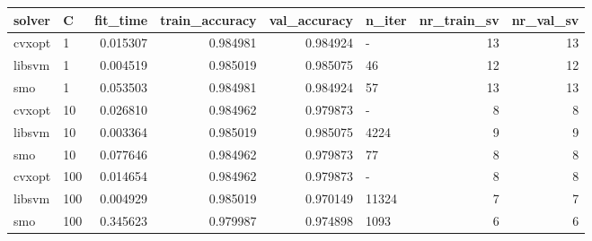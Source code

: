 \begin{tabular}{llrrrlrr}
\toprule
solver &   C &  fit\_time &  train\_accuracy &  val\_accuracy & n\_iter &  nr\_train\_sv &  nr\_val\_sv \\
\midrule
cvxopt &   1 &  0.015307 &        0.984981 &      0.984924 &      - &           13 &         13 \\
libsvm &   1 &  0.004519 &        0.985019 &      0.985075 &     46 &           12 &         12 \\
   smo &   1 &  0.053503 &        0.984981 &      0.984924 &     57 &           13 &         13 \\
cvxopt &  10 &  0.026810 &        0.984962 &      0.979873 &      - &            8 &          8 \\
libsvm &  10 &  0.003364 &        0.985019 &      0.985075 &   4224 &            9 &          9 \\
   smo &  10 &  0.077646 &        0.984962 &      0.979873 &     77 &            8 &          8 \\
cvxopt & 100 &  0.014654 &        0.984962 &      0.979873 &      - &            8 &          8 \\
libsvm & 100 &  0.004929 &        0.985019 &      0.970149 &  11324 &            7 &          7 \\
   smo & 100 &  0.345623 &        0.979987 &      0.974898 &   1093 &            6 &          6 \\
\bottomrule
\end{tabular}
